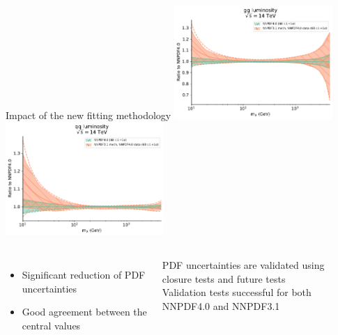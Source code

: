 \documentclass[aspectratio=169,9pt]{beamer}
\begin{document}
\begin{frame}[t]{Impact of the new fitting methodology}
	\includegraphics[width=0.45\textwidth]{lumi1d_gg_NNPDF31meth_NNPDF40data}
	\includegraphics[width=0.45\textwidth]{lumi1d_qq_NNPDF31meth_NNPDF40data}
	\begin{columns}
			\begin{itemize}
	    	        \item Significant reduction of PDF uncertainties
		        \item Good agreement between the central values
		    \end{itemize}
            \begin{block}{}
                \fontsize{7}{6}\selectfont
                PDF uncertainties are validated using closure tests and future tests\\
                Validation tests successful for both NNPDF4.0 and NNPDF3.1 
            \end{block}
    \end{columns}
\end{frame}
\end{document}

